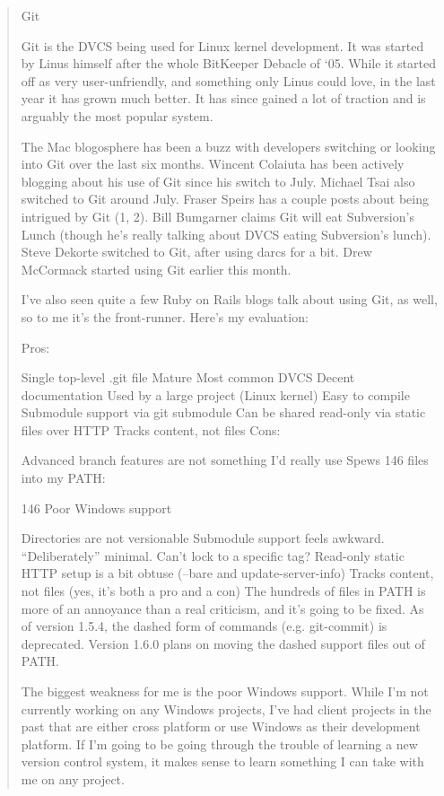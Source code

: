 \begin{enumerate}
\begin{quote}
            Git

            Git is the DVCS being used for Linux kernel development. It was started by Linus himself after the whole BitKeeper Debacle of ‘05. While it started off as very user-unfriendly, and something only Linus could love, in the last year it has grown much better. It has since gained a lot of traction and is arguably the most popular system.

            The Mac blogosphere has been a buzz with developers switching or looking into Git over the last six months. Wincent Colaiuta has been actively blogging about his use of Git since his switch to July. Michael Tsai also switched to Git around July. Fraser Speirs has a couple posts about being intrigued by Git (1, 2). Bill Bumgarner claims Git will eat Subversion’s Lunch (though he’s really talking about DVCS eating Subversion’s lunch). Steve Dekorte switched to Git, after using darcs for a bit. Drew McCormack started using Git earlier this month.

            I’ve also seen quite a few Ruby on Rails blogs talk about using Git, as well, so to me it’s the front-runner. Here’s my evaluation:

            Pros:

            Single top-level .git file
            Mature
            Most common DVCS
            Decent documentation
            Used by a large project (Linux kernel)
            Easy to compile
            Submodule support via git submodule
            Can be shared read-only via static files over HTTP
            Tracks content, not files
            Cons:

            Advanced branch features are not something I’d really use
            Spews 146 files into my PATH:

            146
            Poor Windows support

            Directories are not versionable
            Submodule support feels awkward. “Deliberately” minimal. Can’t lock to a specific tag?
            Read-only static HTTP setup is a bit obtuse (--bare and update-server-info)
            Tracks content, not files (yes, it’s both a pro and a con)
            The hundreds of files in PATH is more of an annoyance than a real criticism, and it’s going to be fixed. As of version 1.5.4, the dashed form of commands (e.g. git-commit) is deprecated. Version 1.6.0 plans on moving the dashed support files out of PATH.

            The biggest weakness for me is the poor Windows support. While I’m not currently working on any Windows projects, I’ve had client projects in the past that are either cross platform or use Windows as their development platform. If I’m going to be going through the trouble of learning a new version control system, it makes sense to learn something I can take with me on any project.


\end{quote}
\end{enumerate}
